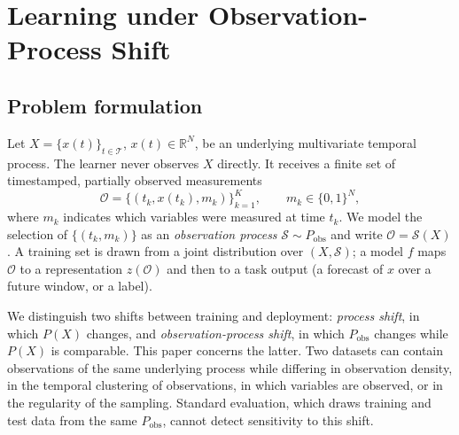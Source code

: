 \documentclass[sigconf,nonacm]{acmart}
\begin{document}
\section{Learning under Observation-Process Shift}
\label{sec:problem}
\subsection{Problem formulation}
Let $X=\{x(t)\}_{t\in\mathcal T}$, $x(t)\in\mathbb R^N$, be an underlying multivariate temporal process. The
learner never observes $X$ directly. It receives a finite set of timestamped, partially observed measurements
\begin{equation}
\mathcal O=\{(t_k, x(t_k), m_k)\}_{k=1}^{K},\qquad m_k\in\{0,1\}^N,
\end{equation}
where $m_k$ indicates which variables were measured at time $t_k$. We model the selection of $\{(t_k,m_k)\}$ as an
\emph{observation process} $\mathcal S\sim P_{\mathrm{obs}}$ and write $\mathcal O=\mathcal S(X)$. A training set is
drawn from a joint distribution over $(X,\mathcal S)$; a model $f$ maps $\mathcal O$ to a representation
$z(\mathcal O)$ and then to a task output (a forecast of $x$ over a future window, or a label).

We distinguish two shifts between training and deployment: \emph{process shift}, in which $P(X)$ changes, and
\emph{observation-process shift}, in which $P_{\mathrm{obs}}$ changes while $P(X)$ is comparable. This paper
concerns the latter. Two datasets can contain observations of the same underlying process while differing in
observation density, in the temporal clustering of observations, in which variables are observed, or in the
regularity of the sampling. Standard evaluation, which draws training and test data from the same
$P_{\mathrm{obs}}$, cannot detect sensitivity to this shift.
\end{document}
